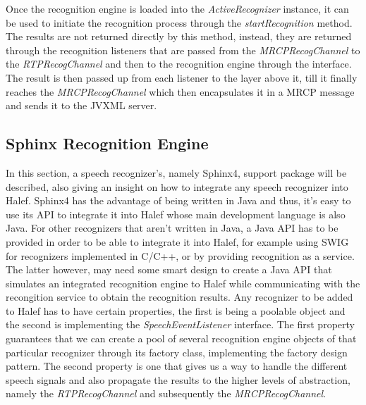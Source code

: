 Once the recognition engine is loaded into the \textit{ActiveRecognizer} instance, it can be used to initiate the recognition process through the \textit{startRecognition} method.
The results are not returned directly by this method, instead, they are returned through the recognition listeners that are passed from the \textit{MRCPRecogChannel} to the \textit{RTPRecogChannel} and then to the recognition engine through the interface.
The result is then passed up from each listener to the layer above it, till it finally reaches the \textit{MRCPRecogChannel} which then encapsulates it in a MRCP message and sends it to the JVXML server.

\subsection{Sphinx Recognition Engine}
In this section, a speech recognizer's, namely Sphinx4,  support package will be described, also giving an insight on how to integrate any speech recognizer into Halef.
Sphinx4 has the advantage of being written in Java and thus, it's easy to use its API to integrate it into Halef whose main development language is also Java.
For other recognizers that aren't written in Java, a Java API has to be provided in order to be able to integrate it into Halef, for example using SWIG for recognizers implemented in C/C++, or by providing recognition as a service.
The latter however, may need some smart design to create a Java API that simulates an integrated recognition engine to Halef while communicating with the recongition service to obtain the recognition results.
Any recognizer to be added to Halef has to have certain properties, the first is being a poolable object and the second is implementing the \textit{SpeechEventListener} interface.
The first property guarantees that we can create a pool of several recognition engine objects of that particular recognizer through its factory class, implementing the factory design pattern.
The second property is one that gives us a way to handle the different speech signals and also propagate the results to the higher levels of abstraction, namely the \textit{RTPRecogChannel} and subsequently the \textit{MRCPRecogChannel}.

